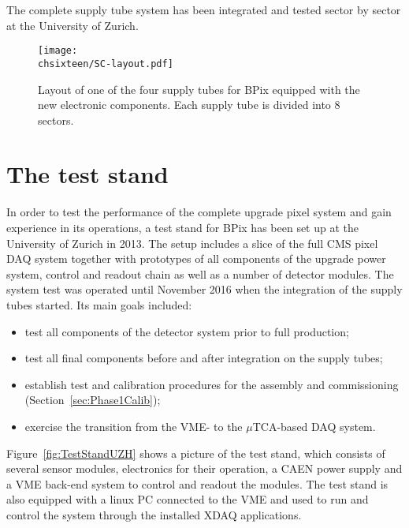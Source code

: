 The complete supply tube system has been integrated and tested sector by sector at the University of Zurich.

\begin{figure}[!htb]
 \begin{center}
 \texttt{[image: \\chsixteen/SC-layout.pdf]}
 \end{center}
 \caption{Layout of one of the four supply tubes for BPix equipped with the new electronic components. Each supply tube is divided into 8 sectors.}
 \label{fig:phase1SC}
\end{figure}

\section{The test stand}

In order to test the performance of the complete upgrade pixel system and gain experience in its operations, a test stand for BPix has been set up at the University of Zurich in 2013.
The setup includes a slice of the full CMS pixel DAQ system together with prototypes of all components of the upgrade power system, control and readout chain as well as a number of detector modules.
The system test was operated until November 2016 when the integration of the supply tubes started.
Its main goals included:
\begin{itemize}
\item test all components of the detector system prior to full production;
\item test all final components before and after integration on the supply tubes;
\item establish test and calibration procedures for the assembly and commissioning (Section~\ref{sec:Phase1Calib});
\item exercise the transition from the VME- to the $\mu$TCA-based DAQ system.
\end{itemize}

Figure~\ref{fig:TestStandUZH} shows a picture of the test stand,
which consists of several sensor modules, electronics for their operation, a CAEN power supply and a VME back-end system to control and readout the modules.
The test stand is also equipped with a linux PC connected to the VME and used to run and control the system through the installed XDAQ applications.

